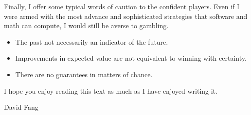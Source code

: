 Finally, I offer some typical words of caution to the confident players.
Even if I were armed with the most advance and sophisticated strategies
that software and math can compute, I would still be averse to gambling.

\begin{itemize}
\item The past not necessarily an indicator of the future.
\item Improvements in expected value are not equivalent to 
	winning with certainty.  
\item There are no guarantees in matters of chance.  
\end{itemize}

I hope you enjoy reading this text as much as I have enjoyed writing it.  

\begin{flushright}
David Fang
\end{flushright}

